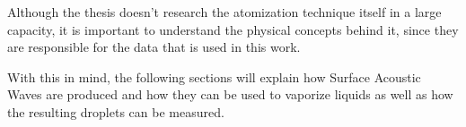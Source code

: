Although the thesis doesn't research the atomization technique itself in a large capacity, it is important to understand the physical concepts behind it, since they are responsible for the data that is used in this work.

With this in mind, the following sections will explain how Surface Acoustic Waves are produced and how they can be used to vaporize liquids as well as how the resulting droplets can be measured.